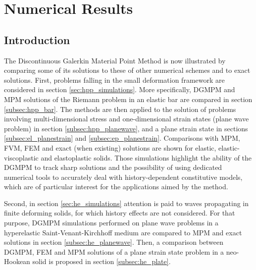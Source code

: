 \chapter{Numerical Results}
\section*{Introduction}
The Discontinuous Galerkin Material Point Method is now illustrated by comparing some of its solutions to these of other numerical schemes and to exact solutions.
First, problems falling in the small deformation framework are considered in section \ref{sec:hpp_simulations}. More specifically, DGMPM and MPM solutions of the Riemann problem in an elastic bar are compared in section \ref{subsec:hpp_bar}. The methods are then applied to the solution of problems involving multi-dimensional stress and one-dimensional strain states (plane wave problem) in section \ref{subsec:hpp_planewave}, and a plane strain state in sections \ref{subsec:el_planestrain} and \ref{subsec:ep_planestrain}. Comparisons with MPM, FVM, FEM and exact (when existing) solutions are shown for elastic, elastic-viscoplastic and elastoplastic solids.
Those simulations highlight the ability of the DGMPM to track sharp solutions and the possibility of using dedicated numerical tools to accurately deal with history-dependent constitutive models, which are of particular interest for the applications aimed by the method. 

Second, in section \ref{sec:he_simulations} attention is paid to waves propagating in finite deforming solids, for which history effects are not considered.
For that purpose, DGMPM simulations performed on plane wave problems in a hyperelastic Saint-Venant-Kirchhoff medium are compared to MPM and exact solutions in section \ref{subsec:he_planewave}. Then, a comparison between DGMPM, FEM and MPM solutions of a plane strain state problem in a neo-Hookean solid is proposed in section \ref{subsec:he_plate}.

